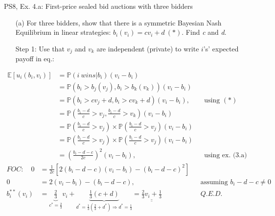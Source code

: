 \begin{frame}{PS8, Ex. 4.a: First-price sealed bid auctions with three bidders}
    \begin{itemize}
      \item[(a)] For three bidders, show that there is a symmetric Bayesian Nash Equilibrium in linear strategies: $b_i(v_i) = cv_i + d\ (*)$. Find \textit{c} and \textit{d}.
      \item[Step 1:] Use that $v_j$ and $v_k$ are independent (private) to write $i$'s' expected payoff in eq.:
    \end{itemize}
    \vspace{-10pt}
    \begin{align*}
      \mathbb{E}[u_i(b_i,v_i)]
      &=\mathbb{P}(i\ wins|b_i)(v_i-b_i)\\
      &=\mathbb{P}\left(b_i>b_j(v_j),b_i>b_k(v_k)\right)(v_i-b_i)\\
      &=\mathbb{P}(b_i>cv_j+d,b_i>cv_k+d)(v_i-b_i),&&\text{using }(*)\\
      &=\mathbb{P}\left(\frac{b_i-d}{c}>v_j,\frac{b_i-d}{c}>v_k\right)(v_i-b_i)\\
      &=\mathbb{P}\left(\frac{b_i-d}{c}>v_j\right)\times\mathbb{P}\left(\frac{b_i-d}{c}>v_j\right)(v_i-b_i)\\
      &=\mathbb{P}\left(\frac{b_i-d}{c}>v_j\right)\times\mathbb{P}\left(\frac{b_i-d}{c}>v_j\right)(v_i-b_i)\\
      &=\left(\frac{b_i-d-c}{2c}\right)^2(v_i-b_i),&&\text{using ex. (3.a)}
    \end{align*}
    \vspace{-8pt}
    \begin{align*}
      FOC:\quad   0&=\frac{1}{2c}[2(b_i-d-c)(v_i-b_i)-(b_i-d-c)^2]\\
                  0&=2(v_i-b_i)-(b_i-d-c),&&\text{assuming }b_i-d-c\neq0\\
      b_i^{**}(v_i)&=\underbrace{\frac{2}{3}}_{c^{*}=\frac{2}{3}}v_i+\underbrace{\frac{1}{3}(c+d)}_{d^{*}=\frac{1}{3}\left(\frac{2}{3}+d^{*}\right)\Rightarrow d^{*}=\frac{1}{3}}=\underline{\underline{\frac{2}{3}v_i+\frac{1}{3}}}&&Q.E.D.
    \end{align*}
    \vfill\null
\end{frame}


